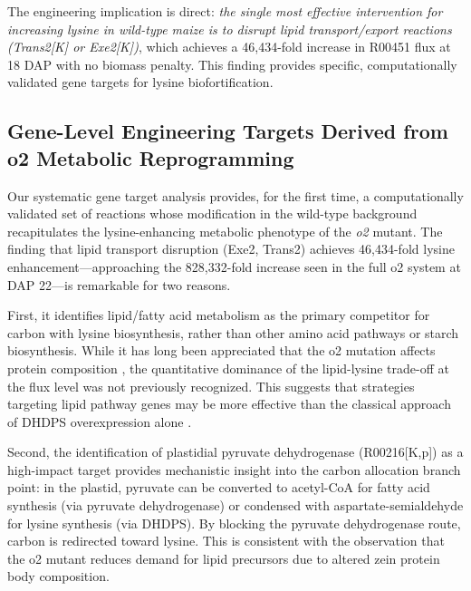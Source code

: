 The engineering implication is direct: \textit{the single most effective intervention for increasing lysine in wild-type maize is to disrupt lipid transport/export reactions (Trans2[K] or Exe2[K])}, which achieves a 46,434-fold increase in R00451 flux at 18 DAP with no biomass penalty. This finding provides specific, computationally validated gene targets for lysine biofortification.


\subsection{Gene-Level Engineering Targets Derived from o2 Metabolic Reprogramming}

Our systematic gene target analysis provides, for the first time, a computationally validated set of reactions whose modification in the wild-type background recapitulates the lysine-enhancing metabolic phenotype of the \textit{o2} mutant. The finding that lipid transport disruption (Exe2, Trans2) achieves 46,434-fold lysine enhancement---approaching the 828,332-fold increase seen in the full o2 system at DAP 22---is remarkable for two reasons.

First, it identifies lipid/fatty acid metabolism as the primary competitor for carbon with lysine biosynthesis, rather than other amino acid pathways or starch biosynthesis. While it has long been appreciated that the o2 mutation affects protein composition \citep{Mertz1964, Habben1993}, the quantitative dominance of the lipid-lysine trade-off at the flux level was not previously recognized. This suggests that strategies targeting lipid pathway genes may be more effective than the classical approach of DHDPS overexpression alone \citep{Frizzi2008}.

Second, the identification of plastidial pyruvate dehydrogenase (R00216[K,p]) as a high-impact target provides mechanistic insight into the carbon allocation branch point: in the plastid, pyruvate can be converted to acetyl-CoA for fatty acid synthesis (via pyruvate dehydrogenase) or condensed with aspartate-semialdehyde for lysine synthesis (via DHDPS). By blocking the pyruvate dehydrogenase route, carbon is redirected toward lysine. This is consistent with the observation that the o2 mutant reduces demand for lipid precursors due to altered zein protein body composition.

